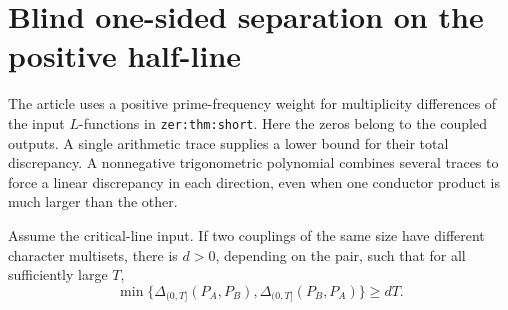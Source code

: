 \section{Blind one-sided separation on the positive half-line}
\label{sec:riesz}

The article uses a positive prime-frequency weight for multiplicity differences of the input $L$-functions in \texttt{zer:thm:short}. Here the zeros belong to the coupled outputs. A single arithmetic trace supplies a lower bound for their total discrepancy. A nonnegative trigonometric polynomial combines several traces to force a linear discrepancy in each direction, even when one conductor product is much larger than the other.

\begin{theorem}\label{thm:directional}
Assume the critical-line input. If two couplings of the same size have different character multisets, there is $d>0$, depending on the pair, such that for all sufficiently large $T$,
\[
 \min\bigl\{\Delta_{(0,T]}(P_A,P_B),\Delta_{(0,T]}(P_B,P_A)\bigr\}\ge dT .
\]
\end{theorem}
